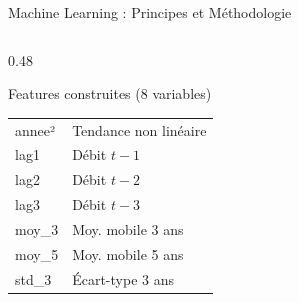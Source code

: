 \documentclass[aspectratio=169, 9pt]{beamer}
\begin{document}
\begin{frame}{Machine Learning : Principes et Méthodologie}
\begin{columns}[T]
\begin{column}{0.48\textwidth}
\begin{block}{Features construites (8 variables)}
\begin{tabular}{ll}
      annee²      & Tendance non linéaire \\
      lag1        & Débit $t-1$ \\
      lag2        & Débit $t-2$ \\
      lag3        & Débit $t-3$ \\
      moy\_3      & Moy. mobile 3 ans \\
      moy\_5      & Moy. mobile 5 ans \\
      std\_3      & Écart-type 3 ans \\
      \bottomrule
    \end{tabular}
  \end{block}
\end{column}
\end{columns}
\end{frame}
\end{document}
